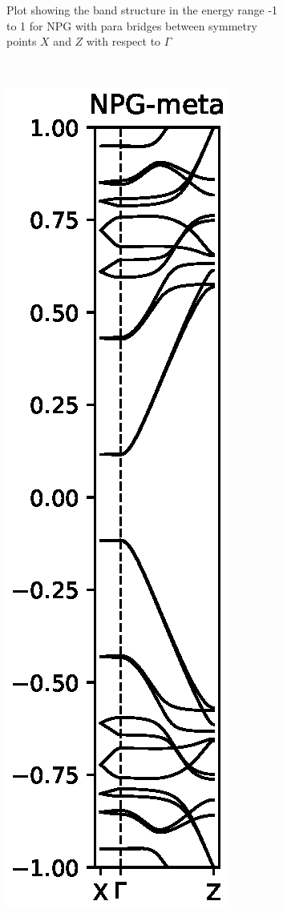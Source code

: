 \begin{figure}
\begin{subfigure}[b]{0.3\textwidth}
		\caption{Plot showing the band structure in the energy range -1 to 1 for NPG with para bridges between symmetry points \(X\) and \(Z\) with respect to \(\Gamma\)}
		\label{parabs}
	\end{subfigure}
	~ %
	\begin{subfigure}[b]{0.3\textwidth}
		\includegraphics[width=\textwidth]{Figures/metaNPGBS.eps}

\end{subfigure}
\end{figure}
